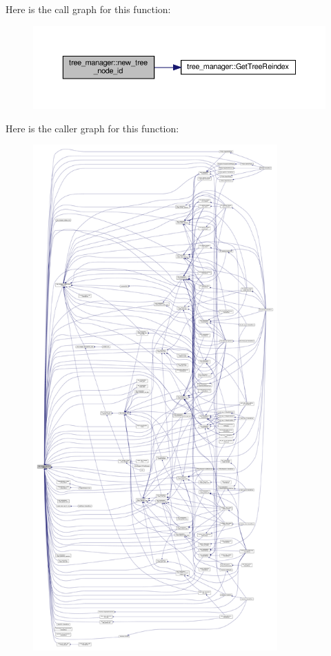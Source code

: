 Here is the call graph for this function\+:
\nopagebreak
\begin{figure}[H]
\begin{center}
\leavevmode
\includegraphics[width=350pt]{d2/ddd/classtree__manager_a92eb582d8b69951ef446f489c462df72_cgraph}
\end{center}
\end{figure}
Here is the caller graph for this function\+:
\nopagebreak
\begin{figure}[H]
\begin{center}
\leavevmode
\includegraphics[height=550pt]{d2/ddd/classtree__manager_a92eb582d8b69951ef446f489c462df72_icgraph}
\end{center}
\end{figure}
\mbox{\label{classtree__manager_aabc0b7559aef6d75af506b5023f4d49b}} 
